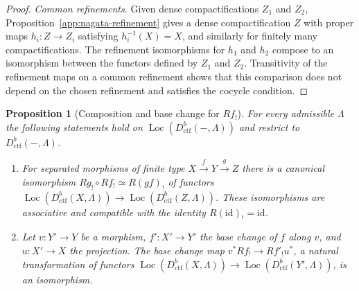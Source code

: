 \documentclass[11pt,a4paper]{article}
\numberwithin{equation}{section}
\newtheorem{proposition}[theorem]{Proposition}
\theoremstyle{definition}
\theoremstyle{remark}
\newcommand{\Loc}{\operatorname{Loc}}
\newcommand{\Dctf}{D^b_{\mathrm{ctf}}}
\begin{document}
\begin{proof}
\emph{Common refinements.} Given dense compactifications $Z_1$ and
$Z_2$, Proposition~\ref{app:nagata-refinement} gives a dense
compactification $Z$ with proper maps $h_i:Z\to Z_i$ satisfying
$h_i^{-1}(X)=X$, and similarly for finitely many compactifications. The
refinement isomorphisms for $h_1$ and $h_2$ compose to an isomorphism
between the functors defined by $Z_1$ and $Z_2$. Transitivity of the
refinement maps on a common refinement shows that this comparison does
not depend on the chosen refinement and satisfies the cocycle
condition.
\end{proof}

\begin{proposition}[Composition and base change for $Rf_!$]
\label{b:prop:lower-composition}
For every admissible $\Lambda$ the following statements hold on
$\Loc(\Dctf(-,\Lambda))$ and restrict to $\Dctf(-,\Lambda)$.
\begin{enumerate}
\item For separated morphisms of finite type $X\xrightarrow fY
  \xrightarrow gZ$ there is a canonical isomorphism
  $Rg_!\circ Rf_!\simeq R(gf)_!$ of functors
  $\Loc(\Dctf(X,\Lambda))\to\Loc(\Dctf(Z,\Lambda))$. These isomorphisms are associative and
  compatible with the identity $R(\mathrm{id})_!=\mathrm{id}$.
\item Let $v:Y'\to Y$ be a morphism, $f':X'\to Y'$ the base change of $f$
  along $v$, and $u:X'\to X$ the projection. The base change map
  $v^*Rf_!\to Rf'_!u^*$, a natural transformation of functors
  $\Loc(\Dctf(X,\Lambda))\to\Loc(\Dctf(Y',\Lambda))$, is an isomorphism.
\end{enumerate}
\end{proposition}
\end{document}
